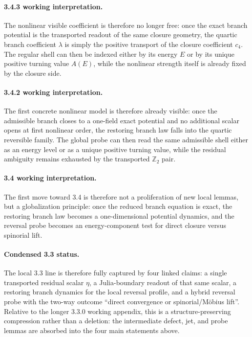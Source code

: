 \documentclass[12pt,a4paper]{article}
\begin{document}
\paragraph{3.4.3 working interpretation.}
The nonlinear visible coefficient is therefore no longer free: once the exact branch potential is the transported readout of the same closure geometry, the quartic branch coefficient $\lambda$ is simply the positive transport of the closure coefficient $c_4$. The regular shell can then be indexed either by its energy $E$ or by its unique positive turning value $A(E)$, while the nonlinear strength itself is already fixed by the closure side.

\paragraph{3.4.2 working interpretation.}
The first concrete nonlinear model is therefore already visible: once the admissible branch closes to a one-field exact potential and no additional scalar opens at first nonlinear order, the restoring branch law falls into the quartic reversible family. The global probe can then read the same admissible shell either as an energy level or as a unique positive turning value, while the residual ambiguity remains exhausted by the transported $\mathbb Z_2$ pair.

\paragraph{3.4 working interpretation.}
The first move toward 3.4 is therefore not a proliferation of new local lemmas, but a globalization principle: once the reduced branch equation is exact, the restoring branch law becomes a one-dimensional potential dynamics, and the reversal probe becomes an energy-component test for direct closure versus spinorial lift.

\paragraph{Condensed 3.3 status.}
The local 3.3 line is therefore fully captured by four linked claims: a single transported residual scalar $\eta$, a Julia-boundary readout of that same scalar, a restoring branch dynamics for the local reversal profile, and a hybrid reversal probe with the two-way outcome ``direct convergence or spinorial/M\"obius lift''. Relative to the longer 3.3.0 working appendix, this is a structure-preserving compression rather than a deletion: the intermediate defect, jet, and probe lemmas are absorbed into the four main statements above.
\end{document}
